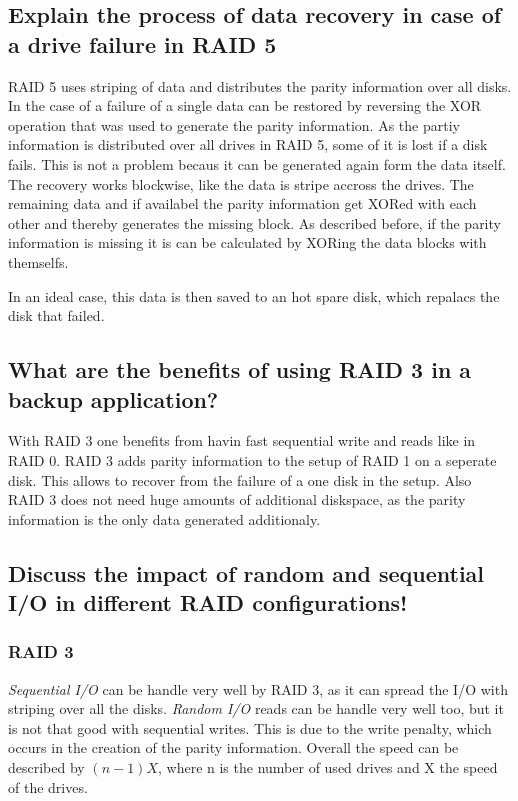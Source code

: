 \documentclass{article}
\begin{document}
\subsection{Explain the process of data recovery in case of a drive failure in RAID 5}
	RAID 5 uses striping of data and distributes the parity information over all disks.
	In the case of a failure of a single  data can be restored by reversing the XOR operation
	that was used to generate the parity information.
	As the partiy information is distributed over all drives in RAID 5,
	some of it is lost if a disk fails.
	This is not a problem becaus it can be generated again form the data itself.
	The recovery works blockwise,
	like the data is stripe accross the drives.
	The remaining data and if availabel the parity information get XORed with each other
	and thereby generates the missing block.
	As described before,
	if the parity information is missing it is can be calculated by XORing the data blocks 
	with themselfs.

	In an ideal case,
	this data is then saved to an hot spare disk,
	which repalacs the disk that failed.

\subsection{What are the benefits of using RAID 3 in a backup application?}
	With RAID 3 one benefits from havin fast sequential write and reads like in RAID 0.
	RAID 3 adds parity information to the setup of RAID 1 on a seperate disk.
	This allows to recover from the failure of a one disk in the setup.
	Also RAID 3 does not need huge amounts of additional diskspace,
	as the parity information is the only data generated additionaly.

\subsection{Discuss the impact of random and sequential I/O in different RAID configurations!}
\subsubsection*{RAID 3}
	\emph{Sequential I/O} can be handle very well by RAID 3,
	as it can spread the I/O with striping over all the disks.
	\emph{Random I/O} reads can be handle very well too,
	but it is not that good with sequential writes.
	This is due to the write penalty,
	which occurs in the creation of the parity information.
	Overall the speed can be described by $(n-1)X$,
	where n is the number of used drives and X the speed of the drives.
\end{document}
